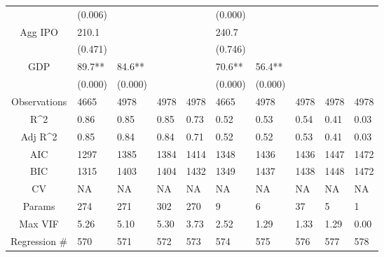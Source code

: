 \documentclass{article}
\begin{document}
\begin{table}[H]
\begin{tabular}{|clllllllll|}
   & (0.006) &  &  &  & (0.000) &  &  &  &  \\
  Agg IPO & 210.1 &  &  &  & 240.7 &  &  &  &  \\
   & (0.471) &  &  &  & (0.746) &  &  &  &  \\
  GDP & 89.7** & 84.6** &  &  & 70.6** & 56.4** &  &  &  \\
   & (0.000) & (0.000) &  &  & (0.000) & (0.000) &  &  &  \\
  \hline
 Observations & 4665 & 4978 & 4978 & 4978 & 4665 & 4978 & 4978 & 4978 & 4978 \\
  R^2 & 0.86 & 0.85 & 0.85 & 0.73 & 0.52 & 0.53 & 0.54 & 0.41 & 0.03 \\
  Adj R^2 & 0.85 & 0.84 & 0.84 & 0.71 & 0.52 & 0.52 & 0.53 & 0.41 & 0.03 \\
  AIC & 1297 & 1385 & 1384 & 1414 & 1348 & 1436 & 1436 & 1447 & 1472 \\
  BIC & 1315 & 1403 & 1404 & 1432 & 1349 & 1437 & 1438 & 1448 & 1472 \\
  CV & NA & NA & NA & NA & NA & NA & NA & NA & NA \\
  Params & 274 & 271 & 302 & 270 & 9 & 6 & 37 & 5 & 1 \\
  Max VIF & 5.26 & 5.10 & 5.30 & 3.73 & 2.52 & 1.29 & 1.33 & 1.29 & 0.00 \\
  Regression \# & 570 & 571 & 572 & 573 & 574 & 575 & 576 & 577 & 578 \\
   \hline
\end{tabular}

\end{table}
\end{document}
